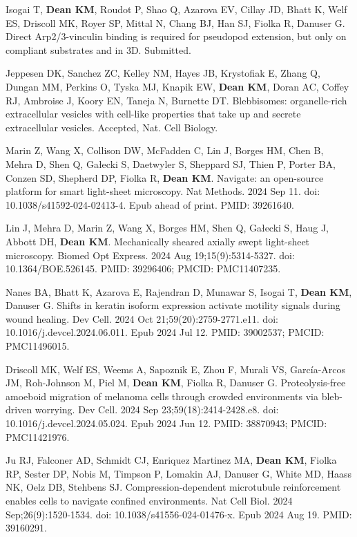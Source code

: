 \begin{etaremune}

\item Isogai T, \textbf{Dean KM}, Roudot P, Shao Q, Azarova EV, Cillay JD, Bhatt K, Welf ES, Driscoll MK, Royer SP, Mittal N, Chang BJ, Han SJ, Fiolka R, Danuser G. Direct Arp2/3-vinculin binding is required for pseudopod extension, but only on compliant substrates and in 3D. Submitted.

\item Jeppesen DK, Sanchez ZC, Kelley NM, Hayes JB, Krystofiak E, Zhang Q, Dungan MM, Perkins O, Tyska MJ, Knapik EW, \textbf{Dean KM}, Doran AC, Coffey RJ, Ambroise J, Koory EN, Taneja N, Burnette DT. Blebbisomes: organelle-rich extracellular vesicles with cell-like properties that take up and secrete extracellular vesicles. Accepted, Nat. Cell Biology.

\item Marin Z, Wang X, Collison DW, McFadden C, Lin J, Borges HM, Chen B, Mehra D, Shen Q, Gałecki S, Daetwyler S, Sheppard SJ, Thien P, Porter BA, Conzen SD, Shepherd DP, Fiolka R, \textbf{Dean KM}. Navigate: an open-source platform for smart light-sheet microscopy. Nat Methods. 2024 Sep 11. doi: 10.1038/s41592-024-02413-4. Epub ahead of print. PMID: 39261640.

\item Lin J, Mehra D, Marin Z, Wang X, Borges HM, Shen Q, Gałecki S, Haug J, Abbott DH, \textbf{Dean KM}. Mechanically sheared axially swept light-sheet microscopy. Biomed Opt Express. 2024 Aug 19;15(9):5314-5327. doi: 10.1364/BOE.526145. PMID: 39296406; PMCID: PMC11407235.

\item Nanes BA, Bhatt K, Azarova E, Rajendran D, Munawar S, Isogai T, \textbf{Dean KM}, Danuser G. Shifts in keratin isoform expression activate motility signals during wound healing. Dev Cell. 2024 Oct 21;59(20):2759-2771.e11. doi: 10.1016/j.devcel.2024.06.011. Epub 2024 Jul 12. PMID: 39002537; PMCID: PMC11496015.

\item Driscoll MK, Welf ES, Weems A, Sapoznik E, Zhou F, Murali VS, García-Arcos JM, Roh-Johnson M, Piel M, \textbf{Dean KM}, Fiolka R, Danuser G. Proteolysis-free amoeboid migration of melanoma cells through crowded environments via bleb-driven worrying. Dev Cell. 2024 Sep 23;59(18):2414-2428.e8. doi: 10.1016/j.devcel.2024.05.024. Epub 2024 Jun 12. PMID: 38870943; PMCID: PMC11421976.

\item Ju RJ, Falconer AD, Schmidt CJ, Enriquez Martinez MA, \textbf{Dean KM}, Fiolka RP, Sester DP, Nobis M, Timpson P, Lomakin AJ, Danuser G, White MD, Haass NK, Oelz DB, Stehbens SJ. Compression-dependent microtubule reinforcement enables cells to navigate confined environments. Nat Cell Biol. 2024 Sep;26(9):1520-1534. doi: 10.1038/s41556-024-01476-x. Epub 2024 Aug 19. PMID: 39160291.


\end{etaremune}
